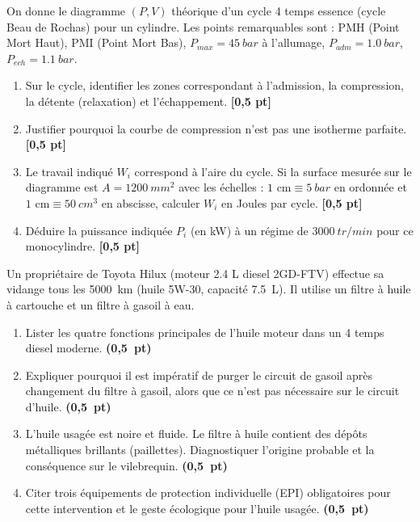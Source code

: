 \documentclass[11pt]{article}
\begin{document}
\begin{exercice}
On donne le diagramme $(P, V)$ théorique d'un cycle 4 temps essence (cycle Beau de Rochas) pour un cylindre. Les points remarquables sont : PMH (Point Mort Haut), PMI (Point Mort Bas), $P_{max} = \SI{45}{bar}$ à l'allumage, $P_{adm} = \SI{1,0}{bar}$, $P_{ech} = \SI{1,1}{bar}$.
\providecommand{\bareme}[1]{\hfill\textbf{[#1 pt]}}
\begin{enumerate}
    \item Sur le cycle, identifier les zones correspondant à l'admission, la compression, la détente (relaxation) et l'échappement. \bareme{0,5}
    \item Justifier pourquoi la courbe de compression n'est pas une isotherme parfaite. \bareme{0,5}
    \item Le travail indiqué $W_i$ correspond à l'aire du cycle. Si la surface mesurée sur le diagramme est $A = \SI{1200}{mm^2}$ avec les échelles : $1 \text{ cm} \equiv \SI{5}{bar}$ en ordonnée et $1 \text{ cm} \equiv \SI{50}{cm^3}$ en abscisse, calculer $W_i$ en Joules par cycle. \bareme{0,5}
    \item Déduire la puissance indiquée $P_i$ (en kW) à un régime de $\SI{3000}{tr/min}$ pour ce monocylindre. \bareme{0,5}
\end{enumerate}
\end{exercice}

\begin{exercice}
Un propriétaire de Toyota Hilux (moteur 2.4 L diesel 2GD-FTV) effectue sa vidange tous les \SI{5000}{km} (huile 5W-30, capacité \SI{7,5}{L}). Il utilise un filtre à huile à cartouche et un filtre à gasoil à eau.
\begin{enumerate}
    \item Lister les quatre fonctions principales de l'huile moteur dans un 4 temps diesel moderne. \hfill\textbf{(0,5~pt)}
    \item Expliquer pourquoi il est impératif de purger le circuit de gasoil après changement du filtre à gasoil, alors que ce n'est pas nécessaire sur le circuit d'huile. \hfill\textbf{(0,5~pt)}
    \item L'huile usagée est noire et fluide. Le filtre à huile contient des dépôts métalliques brillants (paillettes). Diagnostiquer l'origine probable et la conséquence sur le vilebrequin. \hfill\textbf{(0,5~pt)}
    \item Citer trois équipements de protection individuelle (EPI) obligatoires pour cette intervention et le geste écologique pour l'huile usagée. \hfill\textbf{(0,5~pt)}
\end{enumerate}
\end{exercice}
\end{document}
